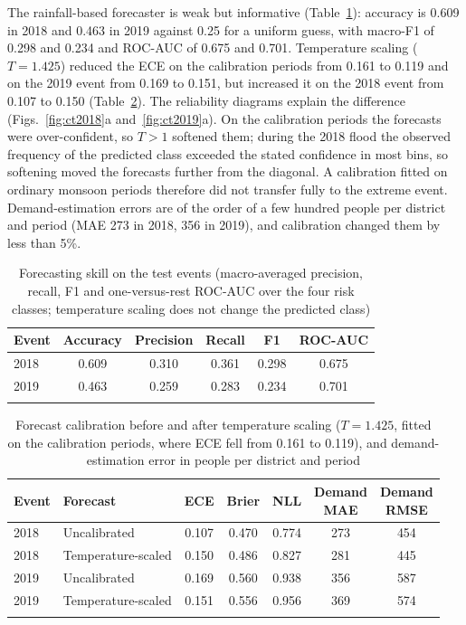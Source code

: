 \documentclass[pdflatex,sn-basic]{sn-jnl}
\theoremstyle{plain}%
\theoremstyle{remark}%
\theoremstyle{definition}%
\begin{document}
The rainfall-based forecaster is weak but informative (Table~\ref{tab:skill}): accuracy is 0.609 in 2018 and 0.463 in 2019 against 0.25 for a uniform guess, with macro-F1 of 0.298 and 0.234 and ROC-AUC of 0.675 and 0.701. Temperature scaling ($T = 1.425$) reduced the ECE on the calibration periods from 0.161 to 0.119 and on the 2019 event from 0.169 to 0.151, but increased it on the 2018 event from 0.107 to 0.150 (Table~\ref{tab:calib}). The reliability diagrams explain the difference (Figs.~\ref{fig:ct2018}a and~\ref{fig:ct2019}a). On the calibration periods the forecasts were over-confident, so $T > 1$ softened them; during the 2018 flood the observed frequency of the predicted class exceeded the stated confidence in most bins, so softening moved the forecasts further from the diagonal. A calibration fitted on ordinary monsoon periods therefore did not transfer fully to the extreme event. Demand-estimation errors are of the order of a few hundred people per district and period (MAE 273 in 2018, 356 in 2019), and calibration changed them by less than 5\%.

\begin{table}[h]
\caption{Forecasting skill on the test events (macro-averaged precision, recall, F1 and one-versus-rest ROC-AUC over the four risk classes; temperature scaling does not change the predicted class)}\label{tab:skill}
\footnotesize
\begin{tabular*}{\textwidth}{@{\extracolsep\fill}lccccc}
\toprule
Event & Accuracy & Precision & Recall & F1 & ROC-AUC \\
\midrule
2018 & 0.609 & 0.310 & 0.361 & 0.298 & 0.675 \\
2019 & 0.463 & 0.259 & 0.283 & 0.234 & 0.701 \\
\botrule
\end{tabular*}
\end{table}

\begin{table}[h]
\caption{Forecast calibration before and after temperature scaling ($T = 1.425$, fitted on the calibration periods, where ECE fell from 0.161 to 0.119), and demand-estimation error in people per district and period}\label{tab:calib}
\footnotesize
\begin{tabular*}{\textwidth}{@{\extracolsep\fill}llccccc}
\toprule
Event & Forecast & ECE & Brier & NLL & \makecell{Demand\\MAE} & \makecell{Demand\\RMSE} \\
\midrule
2018 & Uncalibrated & 0.107 & 0.470 & 0.774 & 273 & 454 \\
2018 & Temperature-scaled & 0.150 & 0.486 & 0.827 & 281 & 445 \\
2019 & Uncalibrated & 0.169 & 0.560 & 0.938 & 356 & 587 \\
2019 & Temperature-scaled & 0.151 & 0.556 & 0.956 & 369 & 574 \\
\botrule
\end{tabular*}
\end{table}
\end{document}

